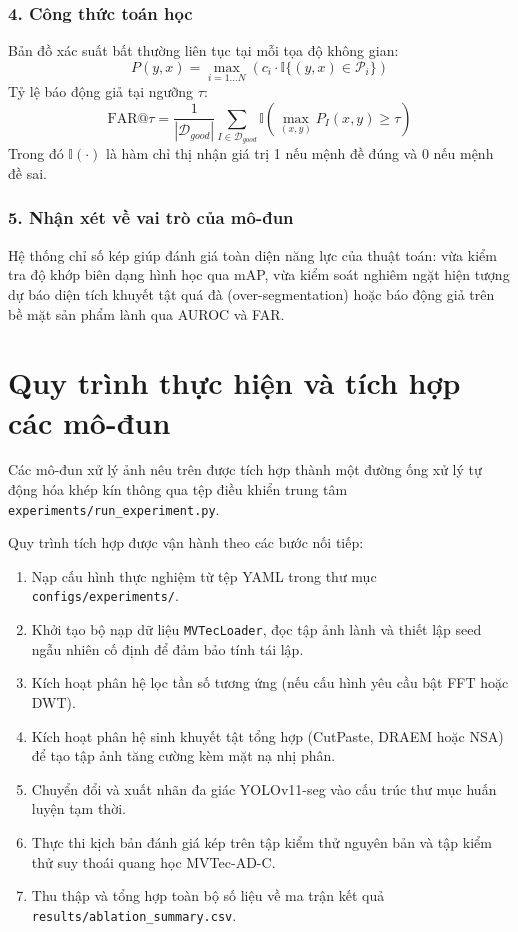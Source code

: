 \subsubsection*{4. Công thức toán học}
Bản đồ xác suất bất thường liên tục tại mỗi tọa độ không gian:
\begin{equation}
    P(y, x) = \max_{i=1 \dots N} \left( c_i \cdot \mathbb{I}\{(y, x) \in \mathcal{P}_i\} \right)
\end{equation}
Tỷ lệ báo động giả tại ngưỡng $\tau$:
\begin{equation}
    \text{FAR}@\tau = \frac{1}{|\mathcal{D}_{good}|} \sum_{I \in \mathcal{D}_{good}} \mathbb{I}\left( \max_{(x, y)} P_I(x, y) \ge \tau \right)
\end{equation}
Trong đó $\mathbb{I}(\cdot)$ là hàm chỉ thị nhận giá trị 1 nếu mệnh đề đúng và 0 nếu mệnh đề sai.

\subsubsection*{5. Nhận xét về vai trò của mô-đun}
Hệ thống chỉ số kép giúp đánh giá toàn diện năng lực của thuật toán: vừa kiểm tra độ khớp biên dạng hình học qua mAP, vừa kiểm soát nghiêm ngặt hiện tượng dự báo diện tích khuyết tật quá đà (over-segmentation) hoặc báo động giả trên bề mặt sản phẩm lành qua AUROC và FAR.

\section{Quy trình thực hiện và tích hợp các mô-đun}

Các mô-đun xử lý ảnh nêu trên được tích hợp thành một đường ống xử lý tự động hóa khép kín thông qua tệp điều khiển trung tâm \texttt{experiments/run\_experiment.py}. 

Quy trình tích hợp được vận hành theo các bước nối tiếp:
\begin{enumerate}
    \item Nạp cấu hình thực nghiệm từ tệp YAML trong thư mục \texttt{configs/experiments/}.
    \item Khởi tạo bộ nạp dữ liệu \texttt{MVTecLoader}, đọc tập ảnh lành và thiết lập seed ngẫu nhiên cố định để đảm bảo tính tái lập.
    \item Kích hoạt phân hệ lọc tần số tương ứng (nếu cấu hình yêu cầu bật FFT hoặc DWT).
    \item Kích hoạt phân hệ sinh khuyết tật tổng hợp (CutPaste, DRAEM hoặc NSA) để tạo tập ảnh tăng cường kèm mặt nạ nhị phân.
    \item Chuyển đổi và xuất nhãn đa giác YOLOv11-seg vào cấu trúc thư mục huấn luyện tạm thời.
    \item Thực thi kịch bản đánh giá kép trên tập kiểm thử nguyên bản và tập kiểm thử suy thoái quang học MVTec-AD-C.
    \item Thu thập và tổng hợp toàn bộ số liệu về ma trận kết quả \texttt{results/ablation\_summary.csv}.
\end{enumerate}

